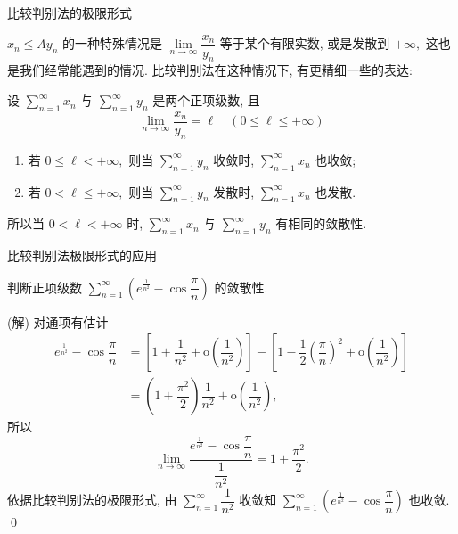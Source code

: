 \begin{frame}{比较判别法的极限形式}

$x_n \leqslant Ay_n$ 的一种特殊情况是 $\lim\limits_{n\to\infty} \dfrac{x_n}{y_n}$ 等于某个有限实数, 或是发散到 $+\infty,$ 这也是我们经常能遇到的情况. 比较判别法在这种情况下, 有更精细一些的表达:

\pause

\begin{thm}[比较判别法的极限形式]
设 $\sum\limits_{n=1}^\infty x_n$ 与 $\sum\limits_{n=1}^\infty y_n$ 是两个正项级数, 且
\[\lim\limits_{n\to\infty} \dfrac{x_n}{y_n} = \ell \quad (0 \leqslant \ell \leqslant +\infty)\]
\begin{enumerate}
\item[(1)] 若 $0 \leqslant \ell < +\infty,$ 则当 $\sum\limits_{n=1}^\infty y_n$ 收敛时, $\sum\limits_{n=1}^\infty x_n$ 也收敛;
\item[(2)] 若 $0 < \ell \leqslant +\infty,$ 则当 $\sum\limits_{n=1}^\infty y_n$ 发散时, $\sum\limits_{n=1}^\infty x_n$ 也发散.
\end{enumerate}
所以当 $0 < \ell < +\infty$ 时, $\sum\limits_{n=1}^\infty x_n$ 与 $\sum\limits_{n=1}^\infty y_n$ 有相同的敛散性.
\end{thm}

\end{frame}


\begin{frame}{比较判别法极限形式的应用}

\begin{eg}
\begin{center}
判断正项级数 $\sum\limits_{n=1}^\infty \left( e^{\frac{1}{n^2}} - \cos\dfrac{\pi}{n} \right)$ 的敛散性.
\end{center}
\end{eg}

\pause

\startproof[bg=yellow, fg=red](解)
对通项有估计
\begin{align*}
e^{\frac{1}{n^2}} - \cos\dfrac{\pi}{n} & = \left[ 1 + \dfrac{1}{n^2} + \mathrm{o}\left(\dfrac{1}{n^2}\right) \right] - \left[ 1 - \dfrac{1}{2} \left(\dfrac{\pi}{n}\right)^2 + \mathrm{o}\left(\dfrac{1}{n^2}\right) \right] \\
& = \left( 1 + \dfrac{\pi^2}{2} \right) \dfrac{1}{n^2} + \mathrm{o}\left(\dfrac{1}{n^2}\right),
\end{align*}
\pause
所以
\[\lim\limits_{n\to\infty} \dfrac{e^{\frac{1}{n^2}} - \cos\dfrac{\pi}{n}}{\dfrac{1}{n^2}} = 1 + \dfrac{\pi^2}{2}.\]
依据比较判别法的极限形式, 由 $\sum\limits_{n=1}^\infty \dfrac{1}{n^2}$ 收敛知 $\sum\limits_{n=1}^\infty \left( e^{\frac{1}{n^2}} - \cos\dfrac{\pi}{n} \right)$ 也收敛.
\qed

\end{frame}

